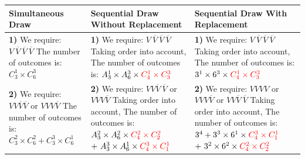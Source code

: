\documentclass[12pt,a4paper]{article}
\begin{document}
\raggedright
\begin{tabular}{|p{6cm}|p{6cm}|p{5cm}|}
\hline
\textbf{Simultaneous Draw} & \textbf{Sequential Draw Without Replacement} & \textbf{Sequential Draw With Replacement}\\
\hline

\makecell[l]{\textbf{1)} We require: $V \ \overline{V} \ \overline{V} \ \overline{V}$\\
The number of outcomes is: $C_3^1 \times C_6^3$}
&
\makecell[l]{\textbf{1)} We require: $V \ \overline{V} \ \overline{V} \ \overline{V}$\\
Taking order into account,\\
The number of outcomes is: $A_3^1 \times A_6^3 \times \color{red} C_4^1 \times C_3^3$}
&
\makecell[l]{\textbf{1)} We require: $V \ \overline{V} \ \overline{V} \ \overline{V}$\\
Taking order into account,\\
The number of outcomes is: $3^1 \times 6^3 \times \color{red} C_4^1 \times C_3^3$}
\\

\hline

\makecell[l]{\textbf{2)} We require:\\
$V V \overline{V} \overline{V}$ or $V V V \overline{V}$\\
The number of outcomes is: $C_3^2 \times C_6^2 + C_3^3 \times C_6^1$}
&
\makecell[l]{\textbf{2)} We require: $V V \overline{V} \ \overline{V}$ or $V V V \overline{V}$\\
Taking order into account,\\
The number of outcomes is: $A_3^2 \times A_6^2 \times \color{red} C_4^2 \times C_2^2$\\
$+ \ A_3^3 \times A_6^1 \times \color{red} C_4^3 \times C_1^1$}
&
\makecell[l]{\textbf{2)} We require:\\
$V V V V$ or $V V V \overline{V}$ or $V V \overline{V} \ \overline{V}$\\
Taking order into account,\\
The number of outcomes is: $3^4 + 3^3 \times 6^1 \times \color{red} C_4^3 \times C_1^1$\\
$+ \ 3^2 \times 6^2 \times \color{red} C_4^2 \times C_2^2$}
\\

\hline


\end{tabular}
\end{document}
